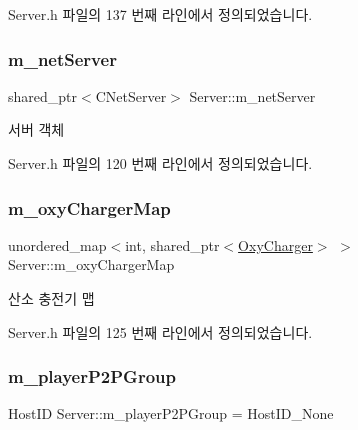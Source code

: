 Server.\+h 파일의 137 번째 라인에서 정의되었습니다.

\mbox{\label{class_server_acc5f0ab874532daace973f25df16888e}} 
\subsubsection{\texorpdfstring{m\+\_\+net\+Server}{m\_netServer}}
{\footnotesize\ttfamily shared\+\_\+ptr$<$C\+Net\+Server$>$ Server\+::m\+\_\+net\+Server\hspace{0.3cm}{\ttfamily [private]}}



서버 객체 



Server.\+h 파일의 120 번째 라인에서 정의되었습니다.

\mbox{\label{class_server_ae2e40fd2b3d85dd1c92ab7bc6e6b7d65}} 
\subsubsection{\texorpdfstring{m\+\_\+oxy\+Charger\+Map}{m\_oxyChargerMap}}
{\footnotesize\ttfamily unordered\+\_\+map$<$int, shared\+\_\+ptr$<$\hyperlink{class_oxy_charger}{Oxy\+Charger}$>$ $>$ Server\+::m\+\_\+oxy\+Charger\+Map\hspace{0.3cm}{\ttfamily [private]}}



산소 충전기 맵 



Server.\+h 파일의 125 번째 라인에서 정의되었습니다.

\mbox{\label{class_server_a8f7f03253584e9db740a5f9f97ff1fc5}} 
\subsubsection{\texorpdfstring{m\+\_\+player\+P2\+P\+Group}{m\_playerP2PGroup}}
{\footnotesize\ttfamily Host\+ID Server\+::m\+\_\+player\+P2\+P\+Group = Host\+I\+D\+\_\+\+None\hspace{0.3cm}{\ttfamily [private]}}



